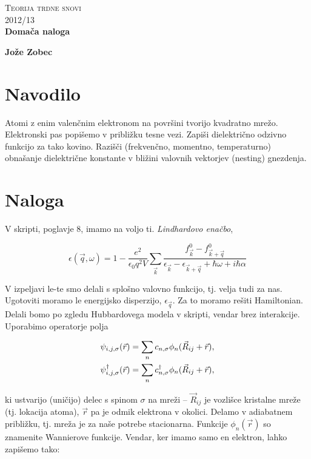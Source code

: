 \documentclass[a4paper, 12pt]{article}
\newcommand{\vq}{
	\ensuremath{\vec{q}}
}
\newcommand{\w}{
	\ensuremath{\omega}
}
\newcommand{\e}{
	\ensuremath{\epsilon}
}
\renewcommand{\ni}{
	\noindent
}
\begin{document}
\begin{center}
\textsc{Teorija trdne snovi}\\
\textsc{2012/13}\\[0.5cm]
\textbf{Doma\v ca naloga}\\
\end{center}
\begin{flushright}
\textbf{Jože Zobec}\\
\end{flushright}

\section{Navodilo}

Atomi z enim valen\v cnim elektronom na povr\v sini tvorijo kvadratno mre\v zo. Elektronski pas
popi\v semo v pribli\v zku tesne vezi. Zapi\v si dielektri\v cno odzivno funkcijo za tako kovino.
Razi\v s\v ci (frekven\v cno, momentno, temperaturno) obna\v sanje dielektri\v cne konstante v
bli\v zini valovnih vektorjev (nesting) gnezdenja.

\section{Naloga}

V skripti, poglavje 8, imamo na voljo ti. \emph{Lindhardovo ena\v cbo},

\begin{equation}
	\e (\vq, \w) = 1 - \frac{e^2}{\e_0 q^2 V} \sum_{\vec{k}} \frac{f_{\vec{k}}^0 -
		f^0_{\vec{k}+\vq}} {\e_{\vec{k}} - \e_{\vec{k}+\vq} + \hbar\w + i\hbar\alpha}
	\label{lindhard}
\end{equation}

V izpeljavi le-te smo delali s splo\v sno valovno funkcijo, tj. velja tudi za nas. Ugotoviti moramo
le energijsko disperzijo, $\e_{\vq}$. Za to moramo re\v siti Hamiltonian. Delali bomo po zgledu
Hubbardovega modela v skripti, vendar brez interakcije. Uporabimo operatorje polja

\begin{align}
	\psi_{i,j,\sigma}(\vec{r}) &= \sum_n c_{n,\sigma} \phi_n (\vec{R}_{ij} + \vec{r}),\notag  \\
	\psi^\dagger_{i,j,\sigma}(\vec{r}) &= \sum_n c^\dagger_{n,\sigma} \phi_n (\vec{R}_{ij} +
		\vec{r}),
	\label{polje}
\end{align}

\ni ki ustvarijo (uni\v cijo) delec s spinom $\sigma$ na mre\v zi -- $\vec{R}_{ij}$ je vozli\v sce
kristalne mre\v ze (tj. lokacija atoma), $\vec{r}$ pa je odmik elektrona v okolici. Delamo v
adiabatnem pribli\v zku, tj. mre\v za je za na\v se potrebe stacionarna. Funkcije $\phi_n (\vec{r})$
so znamenite Wannierove funkcije. Vendar, ker imamo samo en elektron, lahko zapi\v semo tako:
\end{document}
